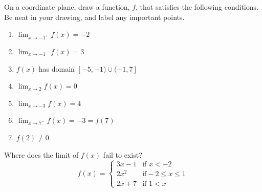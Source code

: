 \documentclass{ximera}
\begin{document}
\begin{exercise}
    On a coordinate plane, draw a function, $f$, that satisfies the following conditions.  Be neat in your drawing, and label any important points.
        \begin{enumerate}
            \item $\displaystyle\lim_{x\rightarrow -1^+}f(x)=-2$
            \item $\displaystyle\lim_{x\rightarrow -1^-} f(x)=3$
            \item $f(x)$ has domain $[-5, -1)\cup(-1,7] $
            \item $\displaystyle\lim_{x\rightarrow 2}f(x)=0$
            \item $\displaystyle\lim_{x\rightarrow -3}f(x)=4$
            \item $\displaystyle\lim_{x\rightarrow 7^-} f(x)=-3=f(7)$
            \item $f(2)\neq 0$
        \end{enumerate}
\end{exercise}


\begin{exercise}
    Where does the limit of $f(x)$ fail to exist?  
      \[f(x)=
    \begin{cases}
    3x-1 &\text{if }x<-2\\
    2x^2 &\text{if} -2\leq x\leq 1\\
    2x+7 & \text{if } 1<x
    \end{cases}\]
\end{exercise}
\end{document}
